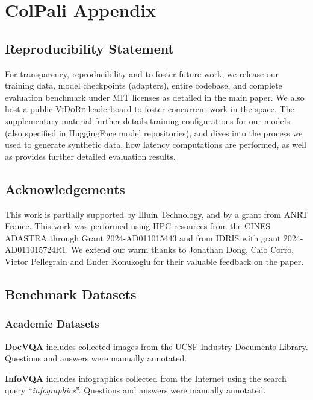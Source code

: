 \chapter{ColPali Appendix}

\section*{Reproducibility Statement}

For transparency, reproducibility and to foster future work, we release our training data, model checkpoints (adapters), entire codebase, and complete evaluation benchmark under MIT licenses as detailed in the main paper. We also host a public \textsc{ViDoRe} leaderboard to foster concurrent work in the space. The supplementary material further details training configurations for our models (also specified in HuggingFace model repositories), and dives into the process we used to generate synthetic data, how latency computations are performed, as well as provides further detailed evaluation results.



\section*{Acknowledgements}

This work is partially supported by Illuin Technology, and by a grant from ANRT France. This work was performed using HPC resources from the CINES ADASTRA through Grant 2024-AD011015443 and from IDRIS with grant 2024-AD011015724R1.
We extend our warm thanks to Jonathan Dong, Caio Corro, Victor Pellegrain and Ender Konukoglu for their valuable feedback on the paper.


\section{Benchmark Datasets}

\subsection{Academic Datasets}
\label{subsection:academic_datasets}

\noindent\textbf{DocVQA}  includes collected images from the UCSF Industry Documents Library. Questions and answers were manually annotated.

\noindent\textbf{InfoVQA}  includes infographics collected from the Internet using the search query “\textit{infographics}”. Questions and answers were manually annotated.

